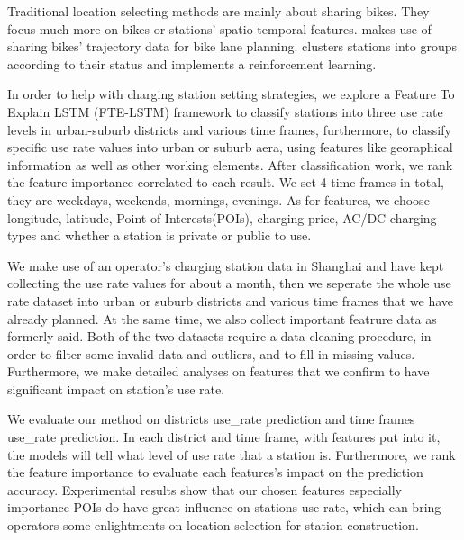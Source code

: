 \documentclass[runningheads]{llncs}
\begin{document}
Traditional location selecting methods are mainly about sharing bikes. They focus much more on bikes or stations' spatio-temporal features. \cite{Bao:2017} makes use of sharing bikes' trajectory data for bike lane planning. \cite{Li:2018:DBR} clusters stations into groups according to their status and implements a reinforcement learning.

In order to help with charging station setting strategies, we explore a Feature To Explain LSTM (FTE-LSTM) framework to classify stations into three use rate levels in urban-suburb districts and various time frames, furthermore, to classify specific use rate values into urban or suburb aera, using features like georaphical information as well as other working elements. After classification work, we rank the feature importance correlated to each result. We set 4 time frames in total, they are weekdays, weekends, mornings, evenings. As for features, we choose longitude, latitude, Point of Interests(POIs), charging price, AC/DC charging types and whether a station is private or public to use.

We make use of an operator's charging station data in Shanghai and  have kept collecting the use rate values for about a month, then we seperate the whole use rate dataset into urban or suburb districts and various time frames that we have already planned. At the same time, we also collect important featrure data as formerly said. Both of the two datasets require a data cleaning procedure, in order to filter some invalid data and outliers, and to fill in missing values. Furthermore, we make detailed analyses on features that we confirm to have significant impact on station's use rate.

We evaluate our method on districts use\_rate prediction and time frames use\_rate prediction. In each district and time frame, with features put into it, the models will tell what level of use rate that a station is. Furthermore, we rank the feature importance to evaluate each features's impact on the prediction accuracy. Experimental results show that our chosen features especially importance POIs do have great influence on stations use rate, which can bring operators some enlightments on location selection for station construction.
\end{document}
